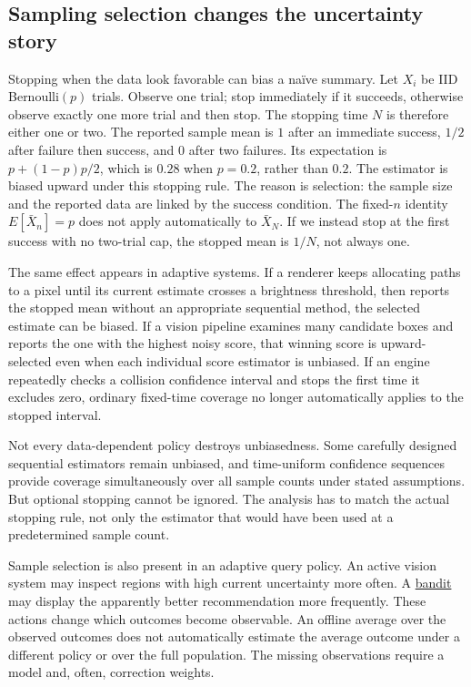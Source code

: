 \subsection{Sampling selection changes the uncertainty story}\label{03-visual-computing-i-ch012-sampling-selection-changes-the-uncertainty-story}

Stopping when the data look favorable can bias a naïve summary. Let \(X_i\) be IID Bernoulli\((p)\) trials. Observe one trial; stop immediately if it succeeds, otherwise observe exactly one more trial and then stop. The stopping time \(N\) is therefore either one or two. The reported sample mean is \(1\) after an immediate success, \(1/2\) after failure then success, and \(0\) after two failures. Its expectation is \(p+(1-p)p/2\), which is \(0.28\) when \(p=0.2\), rather than \(0.2\). The estimator is biased upward under this stopping rule. The reason is selection: the sample size and the reported data are linked by the success condition. The fixed-\(n\) identity \(E[\bar X_n]=p\) does not apply automatically to \(\bar X_N\). If we instead stop at the first success with no two-trial cap, the stopped mean is \(1/N\), not always one.

The same effect appears in adaptive systems. If a renderer keeps allocating paths to a pixel until its current estimate crosses a brightness threshold, then reports the stopped mean without an appropriate sequential method, the selected estimate can be biased. If a vision pipeline examines many candidate boxes and reports the one with the highest noisy score, that winning score is upward-selected even when each individual score estimator is unbiased. If an engine repeatedly checks a collision confidence interval and stops the first time it excludes zero, ordinary fixed-time coverage no longer automatically applies to the stopped interval.

Not every data-dependent policy destroys unbiasedness. Some carefully designed sequential estimators remain unbiased, and time-uniform confidence sequences provide coverage simultaneously over all sample counts under stated assumptions. But optional stopping cannot be ignored. The analysis has to match the actual stopping rule, not only the estimator that would have been used at a predetermined sample count.

Sample selection is also present in an adaptive query policy. An active vision system may inspect regions with high current uncertainty more often. A \hyperref[appendix-3dc863dbddf3]{bandit} may display the apparently better recommendation more frequently. These actions change which outcomes become observable. An offline average over the observed outcomes does not automatically estimate the average outcome under a different policy or over the full population. The missing observations require a model and, often, correction weights.


